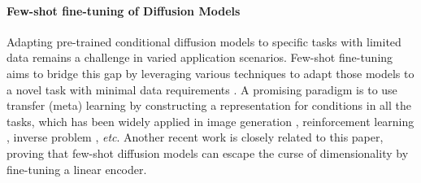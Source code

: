 \paragraph{Few-shot fine-tuning of Diffusion Models}

Adapting pre-trained conditional diffusion models to specific tasks with limited data remains a challenge in varied application scenarios.
Few-shot fine-tuning aims to bridge this gap by leveraging various techniques to adapt those models to a novel task with minimal data requirements \citep{ruiz2023dreambooth,giannone2022few}.
A promising paradigm is to use transfer (meta) learning by constructing a representation for conditions in all the tasks, which has been widely applied in image generation \citep{rombach2022high,ramesh2022hierarchical,sinha2021d2c}, reinforcement learning \citep{he2023diffusion,ni2023metadiffuser}, inverse problem \citep{tewari2023diffusion,chung2023solving}, \textit{etc}.
Another recent work \citet{yang2024fewshot} is closely related to this paper, proving that few-shot diffusion models can escape the curse of dimensionality by fine-tuning a linear encoder.